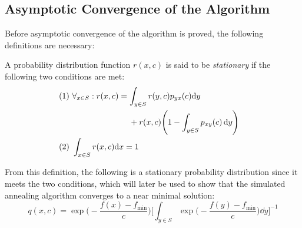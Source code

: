 \subsection{Asymptotic Convergence of the Algorithm}

Before asymptotic convergence of the algorithm is proved, the following definitions are necessary:

\begin{definition}
A probability distribution function $r(x,c)$ is said to be \textit{stationary} if the following two conditions are met:
\begin{align}
    (1)\, & \, \forall_{x \in S}:r(x,c)=\int_{y \in S} r(y,c)p_{yx}(c) \dd y &  \notag \\
    & \hspace{25mm} + r(x,c) \Bigg( 1-\int_{y \in S} p_{xy}(c) \, \dd y \Bigg) &  \\
    (2) \,& \, \int_{x \in S} r(x,c) \dd x =1
\end{align}
\end{definition}

From this definition, the following is a stationary probability distribution since it meets the two conditions, which will later be used to show that the simulated annealing algorithm converges to a near minimal solution:
\begin{equation}
    q(x,c)=\exp{\Bigg( -\dfrac{f(x)-f_{\min}}{c} \Bigg)} \Bigg[ \int_{y \in S} \exp{\Bigg( -\dfrac{f(y)-f_{\min}}{c} \Bigg)}  \dd y \Bigg]^{-1}
    \label{eq:qxc}
\end{equation}


